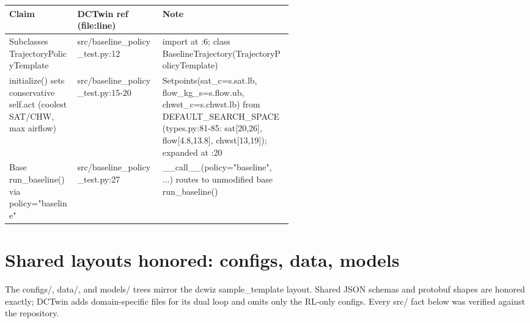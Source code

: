 \documentclass[10pt]{article}
\begin{document}
\vspace{1pt}\begin{tabularx}{\linewidth}{@{}p{0.24\linewidth} p{0.30\linewidth} X@{}}
\toprule
\textbf{Claim} & \textbf{DCTwin ref (file:line)} & \textbf{Note} \\
\midrule
Subclasses TrajectoryPolicyTemplate & src/\allowbreak{}baseline\_\allowbreak{}policy\_\allowbreak{}test.py:12 & import at :6; class BaselineTrajectory(TrajectoryPolicyTemplate) \\
initialize() sets conservative self.act (coolest SAT/\allowbreak{}CHW, max airflow) & src/\allowbreak{}baseline\_\allowbreak{}policy\_\allowbreak{}test.py:15-20 & Setpoints(sat\_\allowbreak{}c=s.sat.lb, flow\_\allowbreak{}kg\_\allowbreak{}s=s.flow.ub, chwst\_\allowbreak{}c=s.chwst.lb) from DEFAULT\_\allowbreak{}SEARCH\_\allowbreak{}SPACE (types.py:81-85: sat[20,26], flow[4.8,13.8], chwst[13,19]); expanded at :20 \\
Base run\_\allowbreak{}baseline() via policy="baseline" & src/\allowbreak{}baseline\_\allowbreak{}policy\_\allowbreak{}test.py:27 & \_\allowbreak{}\_\allowbreak{}call\_\allowbreak{}\_\allowbreak{}(policy="baseline", ...) routes to unmodified base run\_\allowbreak{}baseline() \\
\bottomrule
\end{tabularx}\vspace{2pt}

\section*{Shared layouts honored: configs, data, models}
The configs/\allowbreak{}, data/\allowbreak{}, and models/\allowbreak{} trees mirror the dcwiz sample\_\allowbreak{}template layout. Shared JSON schemas and protobuf shapes are honored exactly; DCTwin adds domain-specific files for its dual loop and omits only the RL-only configs. Every src/\allowbreak{} fact below was verified against the repository.
\end{document}
